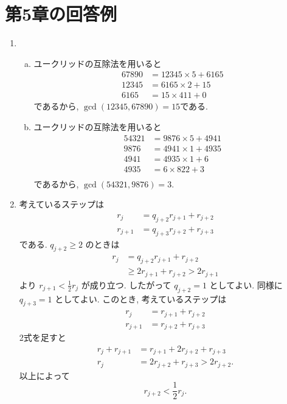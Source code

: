 \documentclass{jarticle}
\begin{document}
\section{第5章の回答例} %
\begin{enumerate}[5.1] %
\item
\begin{enumerate}[(a)] %
  \item ユークリッドの互除法を用いると
    \begin{align*}
      67890 &= 12345 \times 5 + 6165 \\
      12345 &= 6165 \times 2 + 15 \\
      6165  &= 15 \times 411 + 0
    \end{align*}
    であるから, $\gcd(12345, 67890) = 15$である.
  \item ユークリッドの互除法を用いると
    \begin{align*}
      54321 &= 9876 \times 5   + 4941 \\
      9876  &= 4941 \times 1   + 4935 \\
      4941  &= 4935 \times 1   + 6    \\
      4935  &= 6    \times 822 + 3    \\
    \end{align*}
    であるから, $\gcd(54321, 9876) = 3$.
\end{enumerate} %
\item %
考えているステップは
\begin{align*}
  r_j     &= q_{j+2}r_{j+1} + r_{j+2} \\
  r_{j+1} &= q_{j+3}r_{j+2} + r_{j+3}
\end{align*}
である.
$q_{j+2} \ge 2$ のときは
\begin{align*}
  r_j
    &= q_{j+2}r_{j+1} + r_{j+2} \\
    &\ge 2r_{j+1} + r_{j+2} > 2r_{j+1}
\end{align*}
より $r_{j+1} < \frac{1}{2} r_j$ が成り立つ.
したがって $q_{j+2} = 1$ としてよい.
同様に$q_{j+3} = 1$ としてよい.
このとき, 考えているステップは
\begin{align*}
  r_j &= r_{j+1} + r_{j+2} \\
  r_{j+1} &= r_{j+2} + r_{j+3}
\end{align*}
2式を足すと
\begin{align*}
  r_{j} + r_{j+1} &= r_{j+1} + 2r_{j+2} + r_{j+3} \\
  r_j &= 2r_{j+2} + r_{j+3} > 2r_{j+2}.
\end{align*}
以上によって
\[
  r_{j+2} < \frac{1}{2} r_j.
\]


\end{enumerate}
\end{document}
